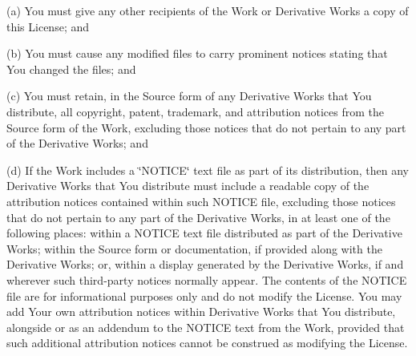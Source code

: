 \begin{DoxyEnumerate}
(a) You must give any other recipients of the Work or Derivative Works a copy of this License; and

(b) You must cause any modified files to carry prominent notices stating that You changed the files; and

(c) You must retain, in the Source form of any Derivative Works that You distribute, all copyright, patent, trademark, and attribution notices from the Source form of the Work, excluding those notices that do not pertain to any part of the Derivative Works; and

(d) If the Work includes a \char`\"{}\+N\+O\+T\+I\+C\+E\char`\"{} text file as part of its distribution, then any Derivative Works that You distribute must include a readable copy of the attribution notices contained within such N\+O\+T\+I\+CE file, excluding those notices that do not pertain to any part of the Derivative Works, in at least one of the following places\+: within a N\+O\+T\+I\+CE text file distributed as part of the Derivative Works; within the Source form or documentation, if provided along with the Derivative Works; or, within a display generated by the Derivative Works, if and wherever such third-\/party notices normally appear. The contents of the N\+O\+T\+I\+CE file are for informational purposes only and do not modify the License. You may add Your own attribution notices within Derivative Works that You distribute, alongside or as an addendum to the N\+O\+T\+I\+CE text from the Work, provided that such additional attribution notices cannot be construed as modifying the License.


\end{DoxyEnumerate}
